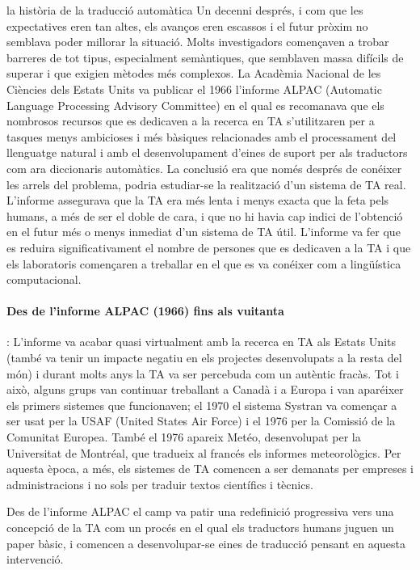 \begin{persabermes}{la història de la traducció automàtica}
  Un decenni després, i com que les expectatives eren tan altes, els
  avanços eren escassos i el futur pròxim no semblava poder millorar
  la situació.  Molts investigadors començaven a trobar barreres de
  tot tipus, especialment semàntiques, que semblaven massa difícils de
  superar i que exigien mètodes més complexos. La Acadèmia Nacional de
  les Ciències dels Estats Units va publicar el 1966 l'informe ALPAC
  (Automatic Language Processing Advisory Committee) en el qual es
  recomanava que els nombrosos recursos que es dedicaven a la recerca
  en TA s'utilitzaren per a tasques menys ambicioses i més bàsiques
  relacionades amb el processament del llenguatge natural i amb el
  desenvolupament d'eines de suport per als traductors com ara
  diccionaris automàtics.  La conclusió era que només després de
  conéixer les arrels del problema, podria estudiar-se la realització
  d'un sistema de TA real. L'informe assegurava que la TA era més
  lenta i menys exacta que la feta pels humans, a més de ser el doble
  de cara, i que no hi havia cap indici de l'obtenció en el futur més
  o menys inmediat d'un sistema de TA útil.  L'informe va fer que es
  reduira significativament el nombre de persones que es dedicaven a
  la TA i que els laboratoris començaren a treballar en el que es va
  conéixer com a lingüística computacional.

  \paragraph{Des de l'informe ALPAC (1966) fins als vuitanta}:
  L'informe va acabar quasi virtualment amb la recerca en TA als
  Estats Units (també va tenir un impacte negatiu en els projectes
  desenvolupats a la resta del món) i durant molts anys la TA va ser
  percebuda com un autèntic fracàs. Tot i això, alguns grups van
  continuar treballant a Canadà i a Europa i van aparéixer els primers
  sistemes que funcionaven; el 1970 el sistema Systran va començar a
  ser usat per la USAF (United States Air Force) i el 1976 per la
  Comissió de la Comunitat Europea.  També el 1976 apareix Metéo,
  desenvolupat per la Universitat de Montréal, que tradueix al francés
  els informes meteorològics.  Per aquesta època, a més, els sistemes
  de TA comencen a ser demanats per empreses i administracions i no
  sols per traduir textos científics i tècnics.

  Des de l'informe ALPAC el camp va patir una redefinició progressiva
  vers una concepció de la TA com un procés en el qual els traductors
  humans juguen un paper bàsic, i comencen a desenvolupar-se eines de
  traducció pensant en aquesta intervenció.


\end{persabermes}
